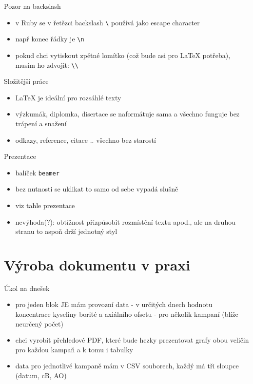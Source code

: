 \documentclass{beamer}
\begin{document}
\begin{frame}{Pozor na backslash}
  \begin{itemize}
    \item v Ruby se v řetězci backslash \texttt{\textbackslash} používá jako escape character
    \item např konec řádky je \texttt{\textbackslash n}
    \item pokud chci vytiskout zpětné lomítko (což bude asi pro LaTeX potřeba), musím ho zdvojit: \texttt{\textbackslash \textbackslash}
  \end{itemize}
\end{frame}

\begin{frame}{Složitější práce}
  \begin{itemize}
    \item LaTeX je ideální pro rozsáhlé texty
    \item výzkumák, diplomka, disertace se naformátuje sama a všechno funguje bez trápení a snažení
    \item odkazy, reference, citace .. všechno bez starostí
  \end{itemize}
\end{frame}

\begin{frame}{Prezentace}
  \begin{itemize}
    \item balíček \texttt{beamer}
    \item bez nutnosti se uklikat to samo od sebe vypadá slušně
    \item viz tahle prezentace
    \item nevýhoda(?): obtížnost přizpůsobit rozmístění textu apod., ale na druhou stranu to aspoň drží jednotný styl
  \end{itemize}
\end{frame}

\section{Výroba dokumentu v praxi}

\begin{frame}{Úkol na dnešek}
  \begin{itemize}
    \item pro jeden blok JE mám provozní data - v určitých dnech hodnotu koncentrace kyseliny borité a axiálního ofsetu - pro několik kampaní (blíže neurčený počet)
    \item chci vyrobit přehledové PDF, které bude hezky prezentovat grafy obou veličin pro každou kampaň a k tomu i tabulky
    \item data pro jednotlivé kampaně mám v CSV souborech, každý má tři sloupce (datum, cB, AO)
  \end{itemize}
\end{frame}
\end{document}
